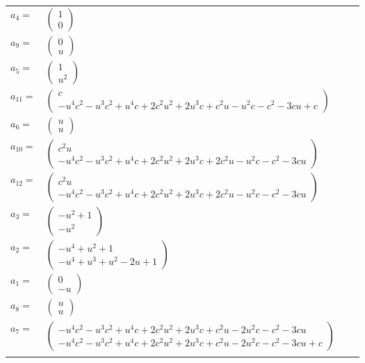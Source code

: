 \documentclass[1p]{elsarticle_modified}
\theoremstyle{definition}
\begin{document}
\begin{tabular}{m{7pt} m{180pt} m{7pt} m{180pt} }
\flushright $a_{4}=$&$\begin{pmatrix}1\\0\end{pmatrix}$ \\
\flushright $a_{9}=$&$\begin{pmatrix}0\\u\end{pmatrix}$ \\
\flushright $a_{5}=$&$\begin{pmatrix}1\\u^2\end{pmatrix}$ \\
\flushright $a_{11}=$&$\begin{pmatrix}c\\- u^4 c^2- u^3 c^2+u^4 c+2 c^2 u^2+2 u^3 c+c^2 u- u^2 c- c^2-3 c u+c\end{pmatrix}$ \\
\flushright $a_{6}=$&$\begin{pmatrix}u\\u\end{pmatrix}$ \\
\flushright $a_{10}=$&$\begin{pmatrix}c^2 u\\- u^4 c^2- u^3 c^2+u^4 c+2 c^2 u^2+2 u^3 c+2 c^2 u- u^2 c- c^2-3 c u\end{pmatrix}$ \\
\flushright $a_{12}=$&$\begin{pmatrix}c^2 u\\- u^4 c^2- u^3 c^2+u^4 c+2 c^2 u^2+2 u^3 c+2 c^2 u- u^2 c- c^2-3 c u\end{pmatrix}$ \\
\flushright $a_{3}=$&$\begin{pmatrix}- u^2+1\\- u^2\end{pmatrix}$ \\
\flushright $a_{2}=$&$\begin{pmatrix}- u^4+u^2+1\\- u^4+u^3+u^2-2 u+1\end{pmatrix}$ \\
\flushright $a_{1}=$&$\begin{pmatrix}0\\- u\end{pmatrix}$ \\
\flushright $a_{8}=$&$\begin{pmatrix}u\\u\end{pmatrix}$ \\
\flushright $a_{7}=$&$\begin{pmatrix}- u^4 c^2- u^3 c^2+u^4 c+2 c^2 u^2+2 u^3 c+c^2 u-2 u^2 c- c^2-3 c u\\- u^4 c^2- u^3 c^2+u^4 c+2 c^2 u^2+2 u^3 c+c^2 u-2 u^2 c- c^2-3 c u+c\end{pmatrix}$\\&\end{tabular}
\end{document}
